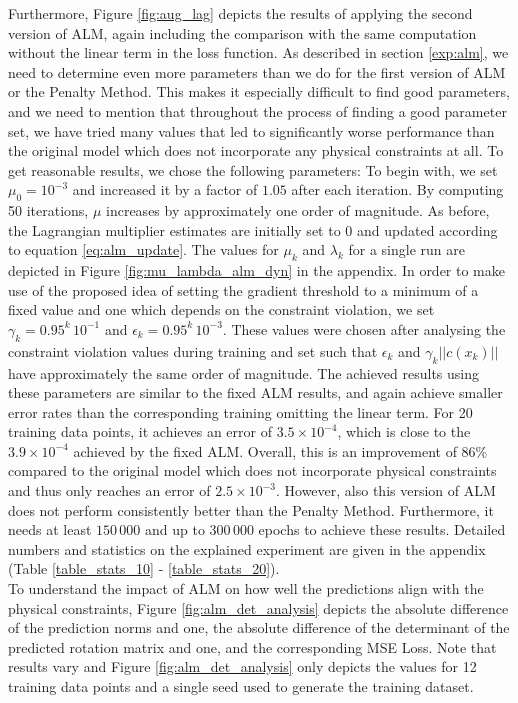 Furthermore, Figure \ref{fig:aug_lag} depicts the results of applying the second version of ALM, again including the comparison with the same computation without the linear term in the loss function. As described in section \ref{exp:alm}, we need to determine even more parameters than we do for the first version of ALM or the Penalty Method. This makes it especially difficult to find good parameters, and we need to mention that throughout the process of finding a good parameter set, we have tried many values that led to significantly worse performance than the original model which does not incorporate any physical constraints at all. To get reasonable results, we chose the following parameters: To begin with, we set $\mu_{0} = 10^{-3}$ and increased it by a factor of $1.05$ after each iteration. By computing 50 iterations, $\mu$ increases by approximately one order of magnitude. As before, the Lagrangian multiplier estimates are initially set to $0$ and updated according to equation \eqref{eq:alm_update}. The values for $\mu_k$ and $\lambda_k$ for a single run are depicted in Figure \ref{fig:mu_lambda_alm_dyn} in the appendix. In order to make use of the proposed idea of setting the gradient threshold to a minimum of a fixed value and one which depends on the constraint violation, we set $\gamma_k = 0.95^k\,10^{-1}$ and $\epsilon_k = 0.95^k\,10^{-3}$. These values were chosen after analysing the constraint violation values during training and set such that $\epsilon_k$ and $\gamma_k ||c(x_k)||$ have approximately the same order of magnitude. The achieved results using these parameters are similar to the fixed ALM results, and again achieve smaller error rates than the corresponding training omitting the linear term. For 20 training data points, it achieves an error of $3.5\times 10^{-4}$, which is close to the $3.9 \times 10^{-4}$ achieved by the fixed ALM. Overall, this is an improvement of $86\%$ compared to the original model which does not incorporate physical constraints and thus only reaches an error of $2.5\times 10^{-3}$. However, also this version of ALM does not perform consistently better than the Penalty Method. Furthermore, it needs at least $150\,000$ and up to $300\,000$ epochs to achieve these results. Detailed numbers and statistics on the explained experiment are given in the appendix (Table \ref{table_stats_10} - \ref{table_stats_20}).\\
\indent To understand the impact of ALM on how well the predictions align with the physical constraints, Figure \ref{fig:alm_det_analysis} depicts the absolute difference of the prediction norms and one, the absolute difference of the determinant of the predicted rotation matrix and one, and the corresponding MSE Loss. Note that results vary and Figure \ref{fig:alm_det_analysis} only depicts the values for 12 training data points and a single seed used to generate the training dataset.

